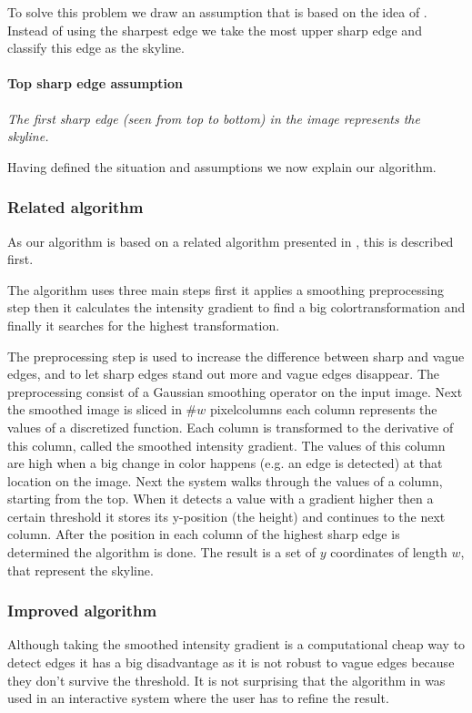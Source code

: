 To solve this problem we draw an assumption that is based on the
idea of \cite{Rover}. Instead of using the sharpest edge we take the most upper sharp
edge and classify this edge as the skyline.\\

\paragraph{Top sharp edge assumption}
\emph{The first sharp edge (seen from top to bottom) in the image 
represents the skyline.}

Having defined the situation and assumptions we now explain our algorithm.

\subsubsection{Related algorithm}
As our algorithm is based on a related algorithm presented in \cite{Rover},
this is described first.


The algorithm uses three main steps first it applies a smoothing preprocessing
step then it calculates the intensity gradient to find a big colortransformation
and finally it searches for the highest transformation.

The preprocessing step is used to increase the difference between sharp and
vague edges, and to let sharp edges stand out more and vague edges disappear.
The preprocessing consist of a Gaussian smoothing operator on the input image.
Next the smoothed image is sliced in \#$w$ pixelcolumns each column represents
the values of a discretized function. Each column is transformed to the
derivative of this column, called the smoothed intensity gradient.  The values
of this column are high when a big change in color happens (e.g. an edge is
detected) at that location on the image.  Next the system walks through the
values of a column, starting from the top.  When it detects a value with a
gradient higher then a certain threshold it stores its y-position (the height)
and continues to the next column.  After the position in each column of the
highest sharp edge is determined the algorithm is done.  The result is a set of
$y$ coordinates of length $w$, that represent the skyline. 

\subsubsection{Improved algorithm}
Although taking the smoothed intensity gradient is a computational cheap way to
detect edges it has a big disadvantage as it is not robust to vague edges
because they don't survive the threshold. It is not surprising that the algorithm in \cite{Rover}
was used in an interactive system where the user has to refine the result.\\

